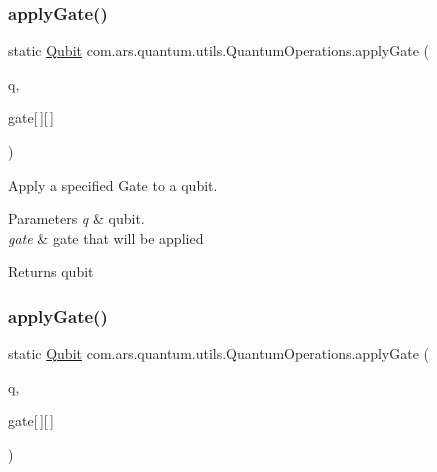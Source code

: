 \subsubsection{\texorpdfstring{apply\+Gate()}{applyGate()}\hspace{0.1cm}{\footnotesize\ttfamily [2/3]}}
{\footnotesize\ttfamily static \hyperlink{classcom_1_1ars_1_1qubits_1_1_qubit}{Qubit} com.\+ars.\+quantum.\+utils.\+Quantum\+Operations.\+apply\+Gate (\begin{DoxyParamCaption}\item[{\hyperlink{classcom_1_1ars_1_1qubits_1_1_qubit}{Qubit}}]{q,  }\item[{double}]{gate\mbox{[}$\,$\mbox{]}\mbox{[}$\,$\mbox{]} }\end{DoxyParamCaption})\hspace{0.3cm}{\ttfamily [static]}}

Apply a specified Gate to a qubit.


\begin{DoxyParams}{Parameters}
{\em q} & qubit. \\
\hline
{\em gate} & gate that will be applied \\
\hline
\end{DoxyParams}
\begin{DoxyReturn}{Returns}
qubit 
\end{DoxyReturn}
\hypertarget{classcom_1_1ars_1_1quantum_1_1utils_1_1_quantum_operations_adbf2c6d628ae274e0c8e68d8712c2732}{}\label{classcom_1_1ars_1_1quantum_1_1utils_1_1_quantum_operations_adbf2c6d628ae274e0c8e68d8712c2732} 
\subsubsection{\texorpdfstring{apply\+Gate()}{applyGate()}\hspace{0.1cm}{\footnotesize\ttfamily [3/3]}}
{\footnotesize\ttfamily static \hyperlink{classcom_1_1ars_1_1qubits_1_1_qubit}{Qubit} com.\+ars.\+quantum.\+utils.\+Quantum\+Operations.\+apply\+Gate (\begin{DoxyParamCaption}\item[{\hyperlink{classcom_1_1ars_1_1qubits_1_1_qubit}{Qubit}}]{q,  }\item[{\hyperlink{classcom_1_1ars_1_1complexnumbers_1_1_complex_number}{Complex\+Number}}]{gate\mbox{[}$\,$\mbox{]}\mbox{[}$\,$\mbox{]} }\end{DoxyParamCaption})\hspace{0.3cm}{\ttfamily [static]}}

